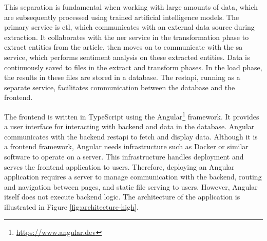 This separation is fundamental when working with large amounts of data, which are subsequently processed using trained artificial intelligence models. The primary service is \acrshort{etl}, which communicates with an external data source during extraction. It collaborates with the \acrshort{ner} service in the transformation phase to extract entities from the article, then moves on to communicate with the \acrshort{sa} service, which performs sentiment analysis on these extracted entities. Data is continuously saved to files in the extract and transform phases. In the load phase, the results in these files are stored in a database. The \acrfull{restapi}, running as a separate service, facilitates communication between the database and the frontend.

The frontend is written in TypeScript using the Angular\footnote{\href{https://www.angular.dev}{https://www.angular.dev}} framework. It provides a user interface for interacting with backend and data in the database. Angular communicates with the backend \acrshort{restapi} to fetch and display data. Although it is a frontend framework, Angular needs infrastructure such as Docker or similar software to operate on a server. This infrastructure handles deployment and serves the frontend application to users. Therefore, deploying an Angular application requires a server to manage communication with the backend, routing and navigation between pages, and static file serving to users. However, Angular itself does not execute backend logic. The architecture of the application is illustrated in Figure \ref{fig:architecture-high}.

